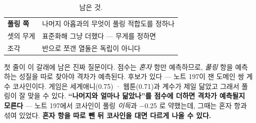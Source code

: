 \documentclass[10pt]{article}
\begin{document}
\begin{table}[t]
\centering\tsize
\caption{남은 것.}
\begin{tabular}{ll}
\toprule
\textbf{풀링 쪽} & 나머지 아홉과의 무엇이 풀링 적합도를 정하나 \\
셋의 무게 & 표준화해 그냥 더했다 --- 무게를 정하면 \\
조각 & 반으로 쪼갠 열둘은 독립이 아니다 \\
\bottomrule
\end{tabular}
\end{table}

첫 줄이 이 갈래에 남은 진짜 질문이다. 점수는 \emph{혼자} 항만 예측하므로,
\emph{풀링} 항을 예측하는 성질을 따로 찾아야 격차가 예측된다. 후보가 있다 ---
노트 197이 잰 도메인 쌍 계수 코사인이다. 게임은 세계애니(0.75) · 웹툰(0.71)과
계수가 제일 닮았고 그래서 풀링이 잘 맞을 수 있다. \textbf{``나머지와 얼마나
닮았나''를 점수에 더하면 격차가 예측될지 모른다} --- 노트 197에서 코사인이
풀링 \emph{이득}과 $-$0.25 로 약했는데, 그때는 혼자 항과 섞여 있었다.
\textbf{혼자 항을 따로 뺀 뒤 코사인을 대면 다르게 나올 수 있다.}
\end{document}
